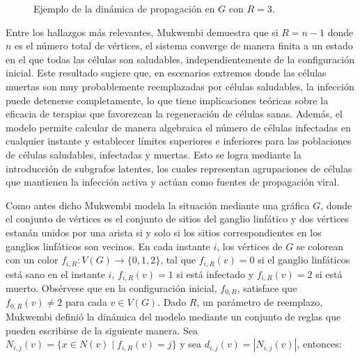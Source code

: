 \documentclass[12pt,titlepage,twoside,openright]{book}
\begin{document}
\begin{figure}[h]
\begin{subfigure}[h]{0.5\linewidth}
    \end{subfigure}
\caption{Ejemplo de la din\'amica de propagaci\'on en $G$ con $R=3$.}
\label{fig:Dinamica}
\end{figure}
Entre los hallazgos m\'as relevantes, Mukwembi demuestra que si $R = n-1$ donde $n$ es el n\'umero total de v\'ertices, el sistema converge de manera finita a un estado en el que todas las c\'elulas son saludables, independientemente de la configuraci\'on inicial. Este resultado sugiere que, en escenarios extremos donde las c\'elulas muertas son muy probablemente reemplazadas por c\'elulas saludables, la infecci\'on puede detenerse completamente, lo que tiene implicaciones te\'oricas sobre la eficacia de terapias que favorezcan la regeneraci\'on de c\'elulas sanas. Adem\'as, el modelo permite calcular de manera algebraica el n\'umero de c\'elulas infectadas en cualquier instante y establecer l\'imites superiores e inferiores para las poblaciones de c\'elulas saludables, infectadas y muertas. Esto se logra mediante la introducci\'on de subgrafos latentes, los cuales representan agrupaciones de c\'elulas que mantienen la infecci\'on activa y act\'uan como fuentes de propagaci\'on viral.

Como antes dicho Mukwembi modela la situaci\'on mediante una gr\'afica $G$, donde el conjunto de v\'ertices es el conjunto de sitios del ganglio linf\'atico y dos v\'ertices estan\'an unidos por una arista si y solo si los sitios correspondientes en los ganglios linf\'aticos son vecinos. En cada instante $i$, los v\'ertices de $G$ se colorean con un color $f_{i,R}: V(G) \rightarrow \{0,1,2\}$, tal que $f_{i,R}(v)=0$ si el ganglio linf\'aticos est\'a sano en el instante $i$, $f_{i,R}(v)=1$ si est\'a infectado y $f_{i,R}(v)=2$ si est\'a muerto. Obs\'ervese que en la configuraci\'on inicial, $f_{0,R}$, satisface que $f_{0,R}(v)\neq 2$ para cada $v\in V(G)$. Dado $R$, un par\'ametro de reemplazo, Mukwembi defini\'o la din\'amica del modelo mediante un conjunto de reglas que pueden escribirse de la siguiente manera. Sea $N_{i,j}(v) =\{ x\in N(v) \mid f_{i,R}(v)=j\}$ y sea $d_{i,j}(v) = |N_{i,j}(v)|$, entonces: 
\end{document}
